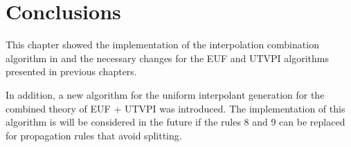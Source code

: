 \section{Conclusions}

This chapter showed the implementation of the
interpolation combination algorithm in 
\cite{10.1007/11532231_26} and the necessary
changes for the EUF and UTVPI algorithms
presented in previous chapters. 

In addition, a new algorithm for the uniform interpolant
generation for the combined theory of EUF + UTVPI 
was introduced. The implementation of this algorithm
is will be considered in the future if the rules 8 and 9
can be replaced for propagation rules that
avoid splitting.

